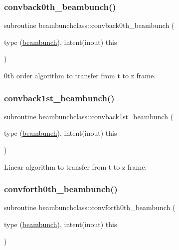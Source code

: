\subsubsection{\texorpdfstring{convback0th\_beambunch()}{convback0th\_beambunch()}}
{\footnotesize\ttfamily subroutine beambunchclass\+::convback0th\+\_\+beambunch (\begin{DoxyParamCaption}\item[{type (\mbox{\hyperlink{namespacebeambunchclass_structbeambunchclass_1_1beambunch}{beambunch}}), intent(inout)}]{this }\end{DoxyParamCaption})}



0th order algorithm to transfer from t to z frame. 

\mbox{\label{namespacebeambunchclass_a704068cca17e98c6568c1e6056d1c4d6}} 
\subsubsection{\texorpdfstring{convback1st\_beambunch()}{convback1st\_beambunch()}}
{\footnotesize\ttfamily subroutine beambunchclass\+::convback1st\+\_\+beambunch (\begin{DoxyParamCaption}\item[{type (\mbox{\hyperlink{namespacebeambunchclass_structbeambunchclass_1_1beambunch}{beambunch}}), intent(inout)}]{this }\end{DoxyParamCaption})}



Linear algorithm to transfer from t to z frame. 

\mbox{\label{namespacebeambunchclass_a030c80c97cd3523478e56fdaff0e7560}} 
\subsubsection{\texorpdfstring{convforth0th\_beambunch()}{convforth0th\_beambunch()}}
{\footnotesize\ttfamily subroutine beambunchclass\+::convforth0th\+\_\+beambunch (\begin{DoxyParamCaption}\item[{type (\mbox{\hyperlink{namespacebeambunchclass_structbeambunchclass_1_1beambunch}{beambunch}}), intent(inout)}]{this }\end{DoxyParamCaption})}



